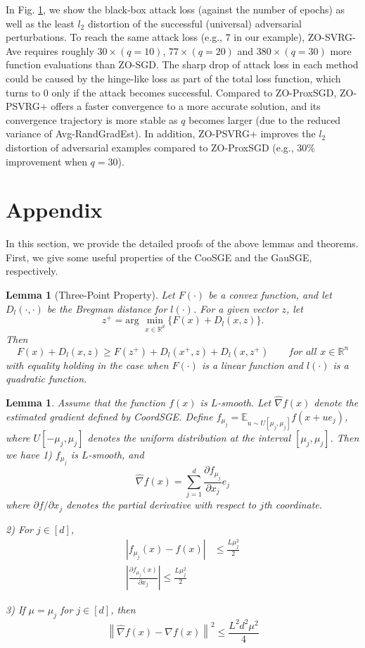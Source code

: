 \documentclass{article}
\newcommand*{\R}{\mathbb{R}}
\newcommand*{\E}{\mathbb{E}}
\newcommand{\norm}[1]{\left\lVert#1\right\rVert}
\newcommand{\abs}[1]{\left|#1\right|}
\newtheorem{lemma}[theorem]{Lemma}
\theoremstyle{definition}
\theoremstyle{remark}
\begin{document}
{\color{Brown}
 In Fig. \ref{}, we show the black-box attack loss (against the number of epochs) as well as the least $l_2$ distortion of the successful (universal) adversarial perturbations. To reach the same
attack loss (e.g., $7$ in our example), ZO-SVRG-Ave requires roughly $30\times (q = 10)$, $77\times (q = 20)$
and $380\times (q = 30)$ more function evaluations than ZO-SGD. The sharp drop of attack loss in each
method could be caused by the hinge-like loss as part of the total loss function, which turns to $0$ only
if the attack becomes successful. Compared to ZO-ProxSGD, ZO-PSVRG+ offers a faster convergence
to a more accurate solution, and its convergence trajectory is more stable as $q$ becomes larger (due to
the reduced variance of Avg-RandGradEst). In addition, ZO-PSVRG+ improves the $l_2$ distortion
of adversarial examples compared to ZO-ProxSGD (e.g., $30\%$ improvement when $q = 30$). 
}
\section{Appendix}
{\color{Green}
In this section, we provide the detailed proofs of the above lemmas and theorems. First, we give some useful properties of the CooSGE and the GauSGE, respectively.
}
\begin{lemma}[Three-Point Property] Let $F(\cdot)$ be a convex function, and let $D_{l}(\cdot,\cdot)$ be the Bregman distance for $l(\cdot)$. For a given vector $z$, let 
\[
z^+ = \text{arg}\,\,\min_{x\in\R^d}\{F(x)+D_{l}(x,z)\}.
\]
Then 
\begin{equation}
F(x) + D_l(x,z) \geq F(z^+) + D_l(x^+,z) + D_l(x,z^+)\qquad for\,\,all\,\,x\in\R^n
\end{equation}
with equality holding in the case when $F(\cdot)$ is a linear function and $l(\cdot)$ is a quadratic function.
\end{lemma}


\begin{lemma}\label{CooSGE}
Assume that the function $f(x)$ is $L$-smooth. Let $\hat{\nabla} f(x)$ denote the estimated gradient defined by CoordSGE. Define $f_{\mu_j} = \E_{u\sim U[\mu_j, \mu_j]} f(x+ue_j)$, where $U[-\mu_j,\mu_j]$ denotes the uniform distribution at the interval $[\mu_j, \mu_j]$. Then we have 
1) $f_{\mu_j}$ is $L$-smooth, and 
\begin{equation}
\hat{\nabla} f(x) = \sum_{j=1}^d \frac{\partial f_{\mu_j}}{\partial x_j}e_j
\end{equation} 
where $\partial f/\partial x_j$ denotes the partial derivative with respect to $j$th coordinate.

2) For $j\in [d]$, 
\begin{align}
\abs{f_{\mu_j}(x) - f(x)} &\leq \frac{L\mu_j^2}{2}\\
\abs{\frac{\partial f_{\mu_j}(x)}{\partial x_j}} \leq \frac{L\mu_j^2}{2}
\end{align}
 
 3) If $\mu = \mu_j$ for $j\in [d]$, then 
 \begin{equation}
 \norm{\hat{\nabla} f(x) - {\nabla} f(x)} ^2 \leq \frac{L^2 d^2 \mu^2}{4}
\end{equation}  
\end{lemma}
\end{document}
